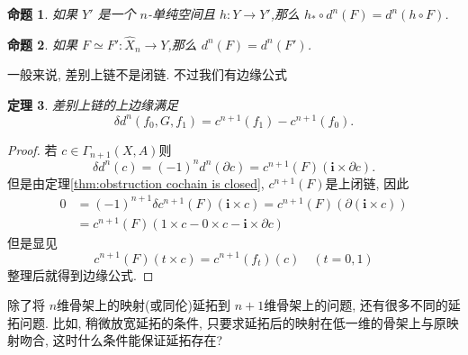 \documentclass{ctexart}
\theoremstyle{plain}
\newtheorem{theorem}{定理}[section]
\newtheorem{proposition}[theorem]{命题}
\theoremstyle{definition}
\begin{document}
            \begin{proposition}
            如果 $Y'$ 是一个 $n$-单纯空间且 $h : Y \to Y'$,那么 $h_* \circ d^n(F) = d^n(h \circ F)$.
            \end{proposition}
            
            \begin{proposition}
            如果 $F \simeq F' : \hat{X}_n \to Y$,那么 $d^n(F) = d^n(F')$.
            \end{proposition}

            一般来说, 差别上链不是闭链. 不过我们有边缘公式

            \begin{theorem}
                \label{thm:coboundary of difference cochain}
                差别上链的上边缘满足
                \begin{equation*}
                  \delta d^{n}(f_0,G,f_1)=c^{n+1}(f_1)-c^{n+1}(f_0).
                \end{equation*}
            \end{theorem}

            \begin{proof}
                若 $c\in \Gamma_{n+1}(X,A)$则 
                \begin{equation*}
                  \delta d^{n}(c)=(-1)^{n}d^{n}(\partial c)=c^{n+1}(F)(\mathbf{i}\times \partial c).
                \end{equation*}
                但是由定理\ref{thm:obstruction cochain is closed}, $c^{n+1}(F)$是上闭链, 因此 
                \begin{equation*}
                  \begin{aligned}
                  0 & =(-1)^{n+1}\delta c^{n+1}(F)(\mathbf{i}\times c)= c^{n+1}(F)(\partial (\mathbf{i}\times c)) \\
                  & =c^{n+1}(F)(1\times c-0\times c-\mathbf{i}\times \partial c)
                  \end{aligned}
                \end{equation*}
                但是显见
                \begin{equation*}
                  c^{n+1}(F)(t\times c)=c^{n+1}(f_{t})(c)\quad (t=0,1)
                \end{equation*}
                整理后就得到边缘公式.
            \end{proof}

            除了将 $n$维骨架上的映射(或同伦)延拓到 $n+1$维骨架上的问题, 还有很多不同的延拓问题. 比如, 稍微放宽延拓的条件, 只要求延拓后的映射在低一维的骨架上与原映射吻合, 这时什么条件能保证延拓存在?
\end{document}
